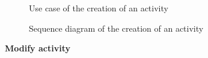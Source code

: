 \documentclass[12pt,titlepage]{article}
\begin{document}
\pagebreak
\begin{figure}
\centering
{}
\caption{Use case of the creation of an activity}
\end{figure}
\begin{figure}
\centering
{} 
\caption{Sequence diagram of the creation of an activity}
\end{figure}

\clearpage
\newpage

\begin{flushleft}
\textbf{Modify activity}
\end{flushleft}
\end{document}
